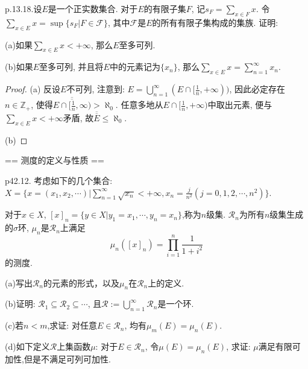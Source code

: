 p.13.18.设$E$是一个正实数集合. 对于$E$的有限子集$F$, 记$s_F=\sum\limits_{x\in F} x$. 
令$\sum\limits_{x\in E} x = \sup\{s_F | F\in \mathcal{F}\}$, 
其中$\mathcal{F}$是$E$的所有有限子集构成的集族. 证明:

(a)如果$\sum\limits_{x\in E} x < +\infty$, 那么$E$至多可列.

(b)如果$E$至多可列, 并且将$E$中的元素记为$\{x_n\}$, 
那么$\sum\limits_{x\in E} x = \sum\limits_{n=1}^{\infty} x_n$.

\begin{proof}
    (a)
    反设$E$不可列, 注意到: $E=\bigcup\limits_{n=1}^{\infty} (E\cap [\frac1n,+\infty))$, 
    因此必定存在$n\in \mathbb{Z}_+$, 
    使得$\overline{\overline{E\cap [\frac1n,\infty)}} > \aleph_0$. 
    任意多地从$E\cap [\frac1n,+\infty)$中取出元素, 
    便与$\sum\limits_{x\in E} x < +\infty$矛盾, 
    故$\overline{\overline{E}} \leq \aleph_0$.


    (b)

\end{proof}

== 测度的定义与性质 ==

p42.12.
考虑如下的几个集合:
$X=\{x=(x_1,x_2,\cdots)|\sum\limits_{n=1}^{\infty} \sqrt{x_n} < +\infty, x_n=\frac{j}{n^2}(j=0,1,2,\cdots, n^2)\}$.


对于$x\in X$, $[x]_n = \{y\in X| y_1 = x_1, \cdots, y_n=x_n\}$,称为$n$级集.
$\mathcal{R}_n$为所有$n$级集生成的$\sigma$环, $\mu_n$是$\mathcal{R}_n$上满足
\[\mu_n([x]_n) = \prod \limits_{i=1}^{n} \frac{1}{1+i^2}\]
的测度.

(a)写出$\mathcal{R}_n$的元素的形式，以及$\mu_n$在$\mathcal{R}_n$上的定义.


(b)证明: $\mathcal{R}_1 \subseteq \mathcal{R}_2\subseteq \cdots$, 
且$\mathcal{R}:=\bigcup\limits_{n=1}^{\infty} \mathcal{R}_n$是一个环.

(c)若$n<m$,求证: 对任意$E \in \mathcal{R}_n$, 均有$\mu_m(E)=\mu_n(E)$.

(d)如下定义$\mathcal{R}$上集函数$\mu$:
对于$E\in \mathcal{R}_n$, 令$\mu(E) = \mu_n(E)$,
求证: $\mu$满足有限可加性,但是不满足可列可加性.

